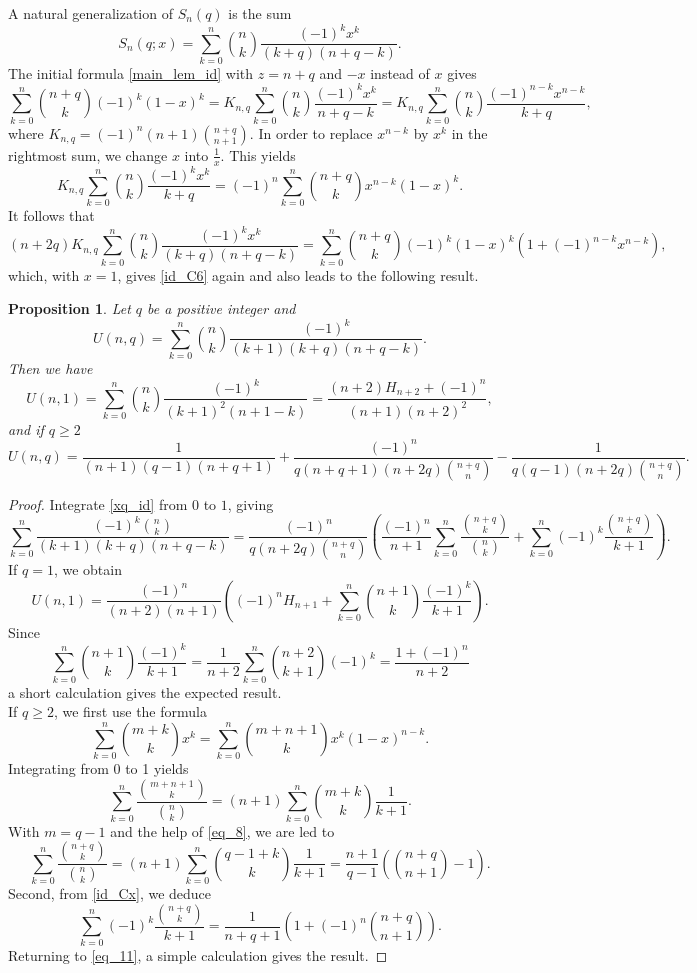 \documentclass[11pt,reqno]{amsart}
\theoremstyle{plain}
\numberwithin{equation}{section}
\newtheorem{proposition}[thm]{Proposition}
\begin{document}
A natural generalization of $S_n(q)$ is the sum
$$S_n(q;x) = \sum_{k=0}^n \binom{n}{k} \frac{(-1)^{k} x^k}{(k+q)(n+q-k)}.$$ 
The initial formula \eqref{main_lem_id} with $z=n+q$ and $-x$ instead of $x$ gives
\[\sum_{k=0}^n \binom{n+q}{k} (-1)^k (1-x)^k = K_{n,q}\sum_{k=0}^n \binom{n}{k} \frac{(-1)^k x^k}{n+q-k}
= K_{n,q}\sum_{k=0}^n \binom{n}{k}\frac{(-1)^{n-k} x^{n-k}}{k+q},\]
where $K_{n,q}=(-1)^n(n+1)\binom{n+q}{n+1}$. In order to replace $x^{n-k}$ by $x^k$ in the rightmost sum, we change $x$ into $\frac{1}{x}$. This yields
\[K_{n,q}\sum_{k=0}^n\binom{n}{k}\frac{(-1)^{k} x^{k}}{k+q} = (-1)^n\sum_{k=0}^n \binom{n+q}{k}x^{n-k}(1-x)^k.\]
It follows that 
\begin{equation}\label{xq_id}
(n+2q)K_{n,q}\sum_{k=0}^n \binom{n}{k} \frac{(-1)^{k}x^k}{(k+q)(n+q-k)}=\sum_{k=0}^n\binom{n+q}{k}(-1)^k(1-x)^k(1+(-1)^{n-k}x^{n-k}),
\end{equation}
which, with $x=1$, gives \eqref{id_C6} again and also leads to the following result.

\begin{proposition}
Let $q$ be a positive integer and
\[U(n,q) = \sum_{k=0}^n \binom{n}{k} \frac{(-1)^{k}}{(k+1)(k+q)(n+q-k)} .\]
Then we have 
\begin{equation}\label{Un1_id}
U(n,1) = \sum_{k=0}^n \binom{n}{k} \frac{(-1)^{k}}{(k+1)^2(n+1-k)} = \frac{(n+2)H_{n+2}+(-1)^n}{(n+1)(n+2)^2},
\end{equation}
and if $q\ge 2$
\begin{equation}
U(n,q) = \frac{1}{(n+1)(q-1)(n+q+1)}+\frac{(-1)^n}{q(n+q+1)(n+2q)\binom{n+q}{n}}-\frac{1}{q(q-1)(n+2q)\binom{n+q}{n}}.
\end{equation}
\end{proposition}
\begin{proof}
Integrate \eqref{xq_id} from $0$ to $1$, giving
\begin{equation}\label{eq_11}
\sum_{k=0}^n \frac{(-1)^{k}\binom{n}{k}}{(k+1)(k+q)(n+q-k)} = \frac{(-1)^n}{q(n+2q) \binom{n+q}{n}}\left(\frac{(-1)^n}{n+1}\sum_{k=0}^n\frac{\binom{n+q}{k}}{\binom{n}{k}}+\sum_{k=0}^n (-1)^k \frac{\binom{n+q}{k}}{k+1}\right).
\end{equation}
If $q=1$, we obtain
\[U(n,1) = \frac{(-1)^n}{(n+2)(n+1)}\left((-1)^n H_{n+1}+\sum_{k=0}^n\binom{n+1}{k}\frac{(-1)^k}{k+1}\right).\]
Since
\[\sum_{k=0}^n\binom{n+1}{k}\frac{(-1)^k}{k+1} = \frac{1}{n+2}\sum_{k=0}^n\binom{n+2}{k+1}(-1)^k=\frac{1+(-1)^n}{n+2}\]
a short calculation gives the expected result. \\[0.2cm]
If $q\ge 2$, we first use the formula \cite[Identity (A)]{Bataille2}
\[\sum_{k=0}^n\binom{m+k}{k} x^k=\sum_{k=0}^n\binom{m+n+1}{k}x^k(1-x)^{n-k}.\]
Integrating from 0 to 1 yields
\[\sum_{k=0}^n\frac{\binom{m+n+1}{k}}{\binom{n}{k}}=(n+1)\sum_{k=0}^n\binom{m+k}{k}\frac{1}{k+1}.\]
With $m=q-1$ and the help of \eqref{eq_8}, we are led to 
\[\sum_{k=0}^n\frac{\binom{n+q}{k}}{\binom{n}{k}}=(n+1)\sum_{k=0}^n\binom{q-1+k}{k}\frac{1}{k+1}=\frac{n+1}{q-1}\left(\binom{n+q}{n+1}-1\right).\]
Second, from \eqref{id_Cx}, we deduce
\[\sum_{k=0}^n (-1)^k \frac{\binom{n+q}{k}}{k+1}=\frac{1}{n+q+1}\left(1+(-1)^{n}\binom{n+q}{n+1}\right).\]
Returning to \eqref{eq_11}, a simple calculation gives the result.
\end{proof}
\end{document}
